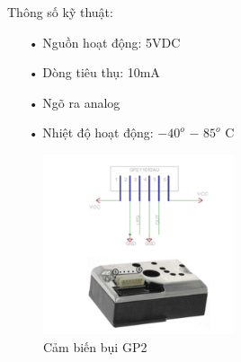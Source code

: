 Thông số kỹ thuật:
\begin{itemize}
\item[•]Nguồn hoạt động: 5VDC
\item[•]Dòng tiêu thụ: 10mA
\item[•]Ngõ ra analog
\item[•]Nhiệt độ hoạt động: $-40^{o}$ $-$ $85 ^{o}$ C
\end{itemize}

\begin{figure}[H]
	\centering    
	\includegraphics[width=0.5\textwidth]{gp2}
	\caption[Cảm biến bụi GP2 ]{Cảm biến bụi GP2}
	\label{fig:gp2}
\end{figure}

\newpage
